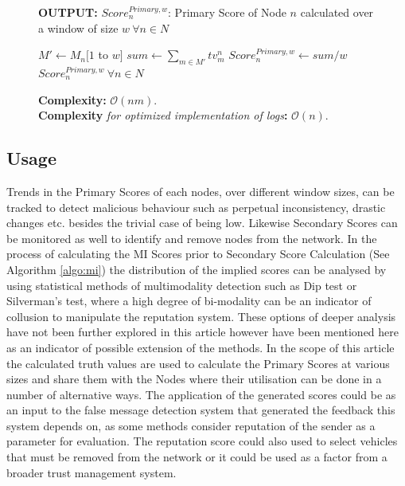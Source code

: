 \documentclass[journal]{IEEEtran}
\begin{document}
\begin{figure}[!t]
\begin{algorithm}[H]
\begin{enumerate}
	\end{enumerate}
	\textbf{OUTPUT:} $ Score^{Primary,w}_n $: Primary Score of Node $ n $ calculated over a window of size $ w\ \forall n\in N$
	\begin{algorithmic}[1]
			\STATE $ M' \leftarrow M_n[1$ to $w] $
			\STATE $ sum \leftarrow \sum_{m\in M'}tv^n_m $ 
			\STATE $ Score^{Primary,w}_n \leftarrow sum/w $ 
		\ENDFOR
		\RETURN $ Score^{Primary,w}_n\ \forall n\in N$
	\end{algorithmic}
	\textbf{Complexity:} $\mathcal{O}(nm)$.\\
	\textbf{Complexity}\textit{ for optimized implementation of logs}\textbf{:} $\mathcal{O}(n)$.
\end{algorithm}
\end{figure}
\subsection{Usage}
\label{sec:PM:usage}
Trends in the Primary Scores of each nodes, over different window sizes, can be tracked to detect malicious behaviour such as perpetual inconsistency, drastic changes etc. besides the trivial case of being low. Likewise Secondary Scores can be monitored as well to identify and remove nodes from the network. In the process of calculating the MI Scores prior to Secondary Score Calculation (See Algorithm \ref{algo:mi}) the distribution of the implied scores can be analysed by using statistical methods of multimodality detection such as Dip test\cite{c:DipTest} or Silverman's test\cite{c:SilvermansTest}, where a high degree of bi-modality can be an indicator of collusion to manipulate the reputation system. These options of deeper analysis have not been further explored in this article however have been mentioned here as an indicator of possible extension of the methods. In the scope of this article the calculated truth values are used to calculate the Primary Scores at various sizes and share them with the Nodes where their utilisation can be done in a number of 
alternative
ways. The application of the generated scores could be as an input to the false message detection system that generated the feedback this system depends on, as some methods consider reputation of the sender as a parameter for evaluation\cite{c:messagefilterCoE}. The reputation score could also used to select vehicles that must be removed from the network or it could be used as a factor from a broader trust management system\cite{c:trustInSIoV}.
\end{document}

